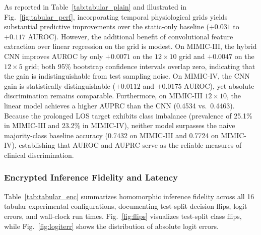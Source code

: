 \documentclass[conference]{IEEEtran}
\begin{document}
As reported in Table~\ref{tab:tabular_plain} and illustrated in Fig.~\ref{fig:tabular_perf}, incorporating temporal physiological grids yields substantial predictive improvements over the static-only baseline ($+0.031$ to $+0.117$ AUROC). However, the additional benefit of convolutional feature extraction over linear regression on the grid is modest. On MIMIC-III, the hybrid CNN improves AUROC by only $+0.0071$ on the $12 \times 10$ grid and $+0.0047$ on the $12 \times 5$ grid; both 95\% bootstrap confidence intervals overlap zero, indicating that the gain is indistinguishable from test sampling noise. On MIMIC-IV, the CNN gain is statistically distinguishable ($+0.0112$ and $+0.0175$ AUROC), yet absolute discrimination remains comparable. Furthermore, on MIMIC-III $12 \times 10$, the linear model achieves a higher AUPRC than the CNN (0.4534 vs.\ 0.4463). Because the prolonged LOS target exhibits class imbalance (prevalence of 25.1\% in MIMIC-III and 23.2\% in MIMIC-IV), neither model surpasses the naive majority-class baseline accuracy (0.7432 on MIMIC-III and 0.7724 on MIMIC-IV), establishing that AUROC and AUPRC serve as the reliable measures of clinical discrimination.

\subsubsection{Encrypted Inference Fidelity and Latency}
Table~\ref{tab:tabular_enc} summarizes homomorphic inference fidelity across all 16 tabular experimental configurations, documenting test-split decision flips, logit errors, and wall-clock run times. Fig.~\ref{fig:flips} visualizes test-split class flips, while Fig.~\ref{fig:logiterr} shows the distribution of absolute logit errors.
\end{document}
